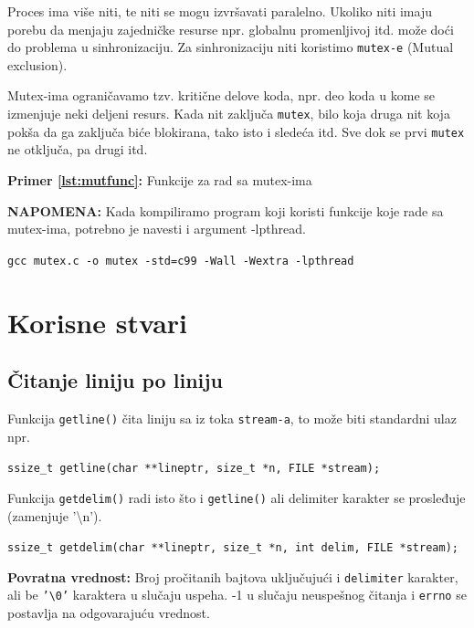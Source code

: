 \documentclass[a4paper, 11pt, twoside]{article}
\newcommand{\scode}[3] {
	\hspace{.06\textwidth} 
	\begin{minipage}[t]{.88\textwidth} %
		\begin{mdframed}[topline=true,bottomline=true,leftline=true,rightline=true,backgroundcolor=gray!22, linecolor=gray!60!black,roundcorner=1mm]
			 

	\begin{center}
		\caption{\textbf{Primer \ref{lst:#3}:} #2}
	\end{center}
	\end{mdframed}
	\end{minipage}

}
\begin{document}
Proces ima više niti, te niti se mogu izvršavati paralelno. Ukoliko niti imaju porebu da menjaju zajedničke resurse npr. globalnu promenljivoj itd. može doći do problema u sinhronizaciju. Za sinhronizaciju niti koristimo \texttt{mutex-e} (Mutual exclusion).

Mutex-ima ograničavamo tzv. kritične delove koda, npr. deo koda u kome se izmenjuje neki deljeni resurs. Kada nit zaključa \texttt{mutex}, bilo koja druga nit koja pokša da ga zaključa biće blokirana, tako isto i sledeća itd. Sve dok se prvi \texttt{mutex} ne otključa, pa drugi itd.

\vspace{2mm} 
\scode{mutex_lock.c}{Funkcije za rad sa mutex-ima}{mutfunc}

\vspace{2mm} 
 \textbf{NAPOMENA:} Kada kompiliramo program koji koristi funkcije koje rade sa mutex-ima, potrebno je navesti i argument -lpthread. 
 \vspace{2mm} 

\begin{center}
	\texttt{gcc mutex.c -o mutex -std=c99 -Wall -Wextra -lpthread} 
\end{center}

\newpage
\section{Korisne stvari}

\subsection{Čitanje liniju po liniju}

Funkcija \texttt{getline()} čita liniju sa iz toka \texttt{stream-a}, to može biti standardni ulaz npr.
\begin{center}
	\texttt{ssize\_t getline(char **lineptr, size\_t *n, FILE *stream);}
\end{center}

Funkcija \texttt{getdelim()} radi isto što i \texttt{getline()} ali delimiter karakter se prosleđuje (zamenjuje '\textbackslash n').

\begin{center}
	\texttt{ssize\_t getdelim(char **lineptr, size\_t *n, int delim, FILE *stream);}
\end{center}

\textbf{Povratna vrednost:} Broj pročitanih bajtova uključujući i \texttt{delimiter} karakter, ali be \texttt{'\textbackslash 0'} karaktera u slučaju uspeha. -1 u slučaju neuspešnog čitanja i \texttt{errno} se postavlja na odgovarajuću vrednost.
\end{document}
